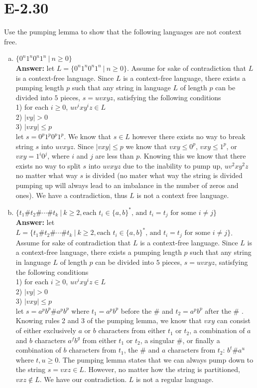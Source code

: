 \documentclass{article}
\begin{document}
\section*{E-2.30} %
Use the pumping lemma to show that the following languages are not
context free.
\begin{enumerate}[a.]
\item $\{ 0^n 1^n 0^n 1^n\ |\ n \geq 0\}$\\
{\bf Answer: } let $ L = \{ 0^n 1^n 0^n 1^n\ |\ n \geq 0\}$. Assume for sake of contradiction that $L$ is a context-free language. Since $L$ is a context-free language, there exists a pumping length $p$ such that any string in language $L$ of length $p$ can be divided into $5$ pieces, $s = uvxyz$, satisfying the following conditions \\
1) for each $i\geq 0$, $uv^ixy^iz \in L$ \\
2) $|vy| >0$ \\
3) $|vxy| \leq p$ \\
let $s=0^p1^p0^p1^p$. We know that $s \in L$ however there exists no way to break string $s$ into $uvxyz$. Since $|vxy| \leq p$ we know that $vxy \leq 0^p$, $vxy \leq 1^p$, or $vxy = 1^i0^j$, where $i$ and $j$ are less than $p$. Knowing this we know that there exists no way to split $s$ into $uvxyz$ due to the inability to pump up, $uv^2xy^2z$ no matter what way $s$ is divided (no mater what way the string is divided pumping up will always lead to an imbalance in the number of zeros and ones). We have a contradiction, thus $L$ is not a context free language.
 

\item $\{ t_1\#t_2\#\cdots\#t_k\ |\ k \geq 2, 
\mbox{each $t_i \in \{a,b\}^*$, and $t_i=t_j$ for some $i \neq j$}\}$\\
{\bf Answer: } let  $L =  \{ t_1\#t_2\#\cdots\#t_k\ |\ k \geq 2,\mbox{each $t_i \in \{a,b\}^*$, and $t_i=t_j$ for some $i \neq j$}\}$. Assume for sake of contradiction that $L$ is a context-free language. Since $L$ is a context-free language, there exists a pumping length $p$ such that any string in language $L$ of length $p$ can be divided into $5$ pieces, $s = uvxyz$, satisfying the following conditions \\
1) for each $i\geq 0$, $uv^ixy^iz \in L$ \\
2) $|vy| >0$ \\
3) $|vxy| \leq p$ \\
let $s = a^pb^p\#a^pb^p$ where $t_1 = a^pb^p$ before the $\#$ and $t_2 = a^pb^p$ after the $\#$ . Knowing rules 2 and 3 of the pumping lemma, we know that $vxy$ can consist of either exclusively $a$ or $b$ characters from either $t_1$ or $t_2$, a combination of $a$ and $b$ characters $a^fb^g$ from either $t_1$ or $t_2$, a singular $\#$, or finally a combination of $b$ characters from $t_1$, the $\#$ and $a$ characters from $t_2$: $b^t\#a^u$ where $t,u \geq 0$. The pumping lemma states that we can always pump down to the string $s=vxz \in L$. However, no matter how the string is partitioned, $vxz \notin L$. We have our contradiction. $L$ is not a regular language.

\end{enumerate}
\end{document}
